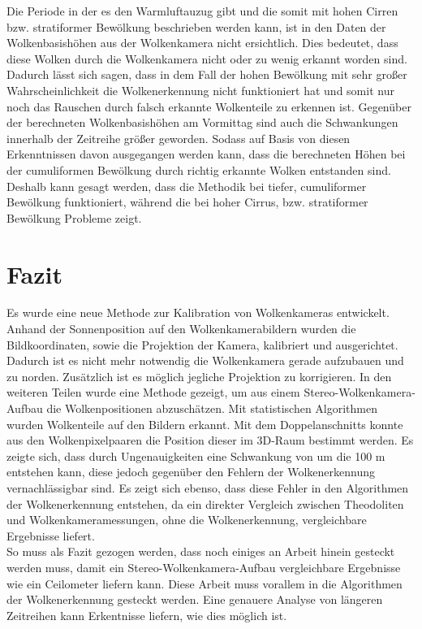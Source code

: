 \documentclass[a4paper,11pt,twoside,german]{article}
\newcommand{\literaturverzeichnis}[1]{
    \renewcommand{\harvardand}{und} %
    
    }
\begin{document}
Die Periode in der es den Warmluftauzug gibt und die somit mit hohen Cirren bzw. stratiformer Bewölkung beschrieben werden kann, ist in den Daten der Wolkenbasishöhen aus der Wolkenkamera nicht ersichtlich. Dies bedeutet, dass diese Wolken durch die Wolkenkamera nicht oder zu wenig erkannt worden sind. Dadurch lässt sich sagen, dass in dem Fall der hohen Bewölkung mit sehr großer Wahrscheinlichkeit die Wolkenerkennung nicht funktioniert hat und somit nur noch das Rauschen durch falsch erkannte Wolkenteile zu erkennen ist. Gegenüber der berechneten Wolkenbasishöhen am Vormittag sind auch die Schwankungen innerhalb der Zeitreihe größer geworden. Sodass auf Basis von diesen Erkenntnissen davon ausgegangen werden kann, dass die berechneten Höhen bei der cumuliformen Bewölkung durch richtig erkannte Wolken entstanden sind. Deshalb kann gesagt werden, dass die Methodik bei tiefer, cumuliformer Bewölkung funktioniert, während die bei hoher Cirrus, bzw. stratiformer Bewölkung Probleme zeigt.  



\section{Fazit}
Es wurde eine neue Methode zur Kalibration von Wolkenkameras entwickelt. Anhand der Sonnenposition auf den Wolkenkamerabildern wurden die Bildkoordinaten, sowie die Projektion der Kamera, kalibriert und ausgerichtet. Dadurch ist es nicht mehr notwendig die Wolkenkamera gerade aufzubauen und zu norden. Zusätzlich ist es möglich jegliche Projektion zu korrigieren. In den weiteren Teilen wurde eine Methode gezeigt, um aus einem Stereo-Wolkenkamera-Aufbau die Wolkenpositionen abzuschätzen. Mit statistischen Algorithmen wurden Wolkenteile auf den Bildern erkannt. Mit dem Doppelanschnitts konnte aus den Wolkenpixelpaaren die Position dieser im 3D-Raum bestimmt werden. Es zeigte sich, dass durch Ungenauigkeiten eine Schwankung von um die 100 m entstehen kann, diese jedoch gegenüber den Fehlern der Wolkenerkennung vernachlässigbar sind. Es zeigt sich ebenso, dass diese Fehler in den Algorithmen der Wolkenerkennung entstehen, da ein direkter Vergleich zwischen Theodoliten und Wolkenkameramessungen, ohne die Wolkenerkennung, vergleichbare Ergebnisse liefert.\\
So muss als Fazit gezogen werden, dass noch einiges an Arbeit hinein gesteckt werden muss, damit ein Stereo-Wolkenkamera-Aufbau vergleichbare Ergebnisse wie ein Ceilometer liefern kann. Diese Arbeit muss vorallem in die Algorithmen der Wolkenerkennung gesteckt werden. Eine genauere Analyse von längeren Zeitreihen kann Erkentnisse liefern, wie dies möglich ist.



\literaturverzeichnis{bibliography} %
\end{document}

